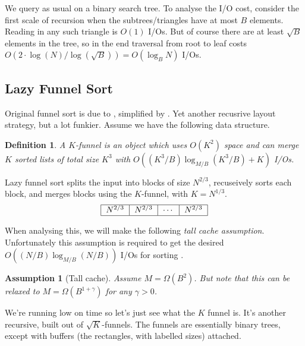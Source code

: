 \documentclass[11pt]{article}
\newtheorem{definition}[theorem]{Definition}
\newtheorem{assumption}[theorem]{Assumption}
\begin{document}
We query as usual on a binary search tree. To analyse the I/O cost,
consider the first scale of recursion when the subtrees/triangles have
at most $B$ elements. Reading in any such triangle is $O(1)$ I/Os. But
of course there are at least $\sqrt{B}$ elements in the tree, so in
the end traversal from root to leaf costs $O(2\cdot \log(N)/\log(\sqrt{B})) =
O(\log_B N)$ I/Os.

\subsection{Lazy Funnel Sort}

Original funnel sort is due to \cite{frigo1999cache}, simplified by
\cite{brodal2002cache}. Yet another recusrive layout strategy, but a
lot funkier. Assume we have the following data structure.

\begin{definition}
  A \emph{$K$-funnel} is an object which uses $O(K^2)$ space and can
  merge $K$ sorted lists of total size $K^3$ with $O((K^3/B)
  \log_{M/B}(K^3/B) + K)$ I/Os.
\end{definition}

Lazy funnel sort splits the input into blocks of size $N^{2/3}$,
recuseively sorts each block, and merges blocks using the $K$-funnel,
with $K = N^{1/3}$.
\[
\begin{tabular}{|c|c|c|c|}
    \hline $N^{2/3}$ & $N^{2/3}$ & $\cdots$ & $N^{2/3}$ \\ \hline
  \end{tabular}
\]

When analysing this, we will make the following \emph{tall cache
  assumption}. Unfortunately this assumption is required to get the
desired $O((N/B) \log_{M/B}(N/B))$ I/Os for sorting
\cite{brodal2002cache}.

\begin{assumption}[Tall cache]
  Assume $M = \Omega(B^2)$. But note that this can be relaxed to $M =
  \Omega(B^{1+\gamma})$ for any $\gamma > 0$.
\end{assumption}

We're running low on time so let's just see what the $K$ funnel
is. It's another recursive, built out of $\sqrt{K}$-funnels. The
funnels are essentially binary trees, except with buffers (the
rectangles, with labelled sizes) attached.
\end{document}
